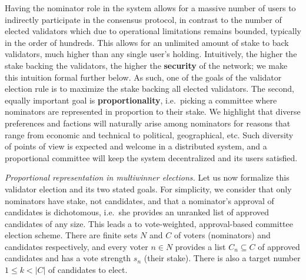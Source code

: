 Having the nominator role in the system allows for a massive number of users to indirectly participate in the consensus protocol, in contrast to the number of elected validators which due to operational limitations remains bounded, typically in the order of hundreds. 
This allows for an unlimited amount of stake to back validators, much higher than any single user's holding. 
Intuitively, the higher the stake backing the validators, the higher the \textbf{security} of the network; we make this intuition formal further below. 
As such, one of the goals of the validator election rule is to maximize the stake backing all elected validators. 
The second, equally important goal is \textbf{proportionality}, i.e.~picking a committee where nominators are represented in proportion to their stake. 
We highlight that diverse preferences and factions will naturally arise among nominators for reasons that range from economic and technical to political, geographical, etc. 
Such diversity of points of view is expected and welcome in a distributed system, and a proportional committee will keep the system decentralized and its users satisfied.


\emph{Proportional representation in multiwinner elections.}
Let us now formalize this validator election and its two stated goals. 
For simplicity, we consider that only nominators have stake, not candidates, and that a nominator's approval of candidates is dichotomous, i.e.~she provides an unranked list of approved candidates of any size. 
This leads a to vote-weighted, approval-based committee election scheme. 
There are finite sets $N$ and $C$ of voters (nominators) and candidates respectively, and every voter $n\in N$ provides a list $C_n\subseteq C$ of approved candidates and has a vote strength $s_n$ (their stake). 
There is also a target number $1\leq k< |C|$ of candidates to elect.

